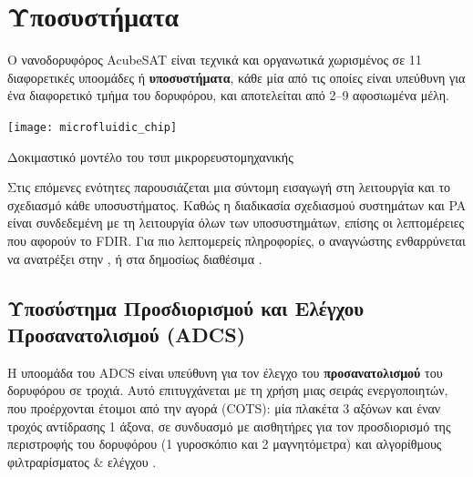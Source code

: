 \documentclass[a4paper,nobib]{tufte-book}
\begin{document}
\section{Υποσυστήματα}

Ο νανοδορυφόρος AcubeSAT είναι τεχνικά και οργανωτικά χωρισμένος σε 11 διαφορετικές υποομάδες ή \textbf{υποσυστήματα}, κάθε μία από τις οποίες είναι υπεύθυνη για ένα διαφορετικό τμήμα του δορυφόρου, και αποτελείται από \SIrange{2}{9}{} αφοσιωμένα μέλη.
\begin{marginfigure}
	\texttt{[image: microfluidic\_chip]}
	\caption{Δοκιμαστικό μοντέλο του τσιπ μικρορευστομηχανικής}
	\label{fig:microfluidic_chip}
\end{marginfigure}

Στις επόμενες ενότητες παρουσιάζεται μια σύντομη εισαγωγή στη λειτουργία και το σχεδιασμό κάθε υποσυστήματος. Καθώς η διαδικασία σχεδιασμού συστημάτων και \acl{PA} είναι %
συνδεδεμένη με τη λειτουργία όλων των υποσυστημάτων,  επίσης οι λεπτομέρειες που αφορούν το \acs{FDIR}. Για πιο λεπτομερείς πληροφορίες, ο αναγνώστης ενθαρρύνεται να ανατρέξει στην , ή στα δημοσίως διαθέσιμα .

\subsection{Υποσύστημα Προσδιορισμού και Ελέγχου Προσανατολισμού (\acs{ADCS})}
\label{sec:adcs}

Η υποομάδα του \ac{ADCS} είναι υπεύθυνη για τον έλεγχο του \textbf{προσανατολισμού} του δορυφόρου σε τροχιά. Αυτό επιτυγχάνεται με τη χρήση μιας σειράς ενεργοποιητών, που προέρχονται έτοιμοι από την αγορά (\ac{COTS}): μία πλακέτα 3 αξόνων και έναν τροχός αντίδρασης 1 άξονα, σε συνδυασμό με αισθητήρες για τον προσδιορισμό της περιστροφής του δορυφόρου (1 γυροσκόπιο και 2 μαγνητόμετρα) και αλγορίθμους φιλτραρίσματος \& ελέγχου \autocite{DDJF_AOCS,velentzas_design_attitude_2021}.
\end{document}
